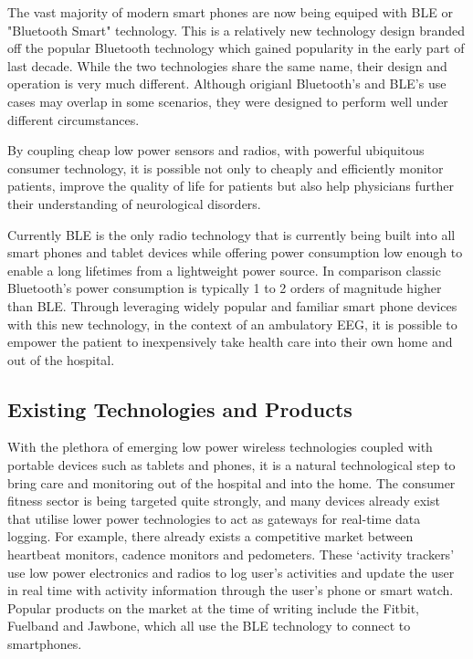 \documentclass[]{article}
\begin{document}
The vast majority of modern smart phones are now being equiped with \ac{BLE} or "Bluetooth Smart" technology. This is a relatively new technology design branded off the popular Bluetooth technology which gained popularity in the early part of last decade. While the two technologies share the same name, their design and operation is very much different. Although origianl Bluetooth's and \ac{BLE}'s use cases may overlap in some scenarios, they were designed to perform well under different circumstances.  

By coupling cheap low power sensors and radios, with powerful ubiquitous consumer technology, it is possible not only to cheaply and efficiently monitor patients, improve the quality of life for patients but also help physicians further their understanding of neurological disorders.

Currently \ac{BLE} is the only radio technology that is currently being built into all smart phones and tablet devices while offering power consumption low enough to enable a long lifetimes from a lightweight power source. In comparison classic Bluetooth’s power consumption is typically 1 to 2 orders of magnitude higher than BLE. Through leveraging widely popular and familiar smart phone devices with this new technology, in the context of an ambulatory EEG, it is possible to empower the patient to inexpensively take health care into their own home and out of the hospital.


\subsection{Existing Technologies and Products}


With the plethora of emerging low power wireless technologies coupled with portable devices such as tablets and phones, it is a natural technological step to bring care and monitoring out of the hospital and into the home. The consumer fitness sector is being targeted quite strongly, and many devices already exist that utilise lower power technologies to act as gateways for real-time data logging. For example, there already exists a competitive market between heartbeat monitors, cadence monitors and pedometers. These ‘activity trackers’ use low power electronics and radios to log user’s activities and update the user in real time with activity information through the user’s phone or smart watch. Popular products on the market at the time of writing include the Fitbit, Fuelband and Jawbone, which all use the \ac{BLE} technology to connect to smartphones.
\end{document}
